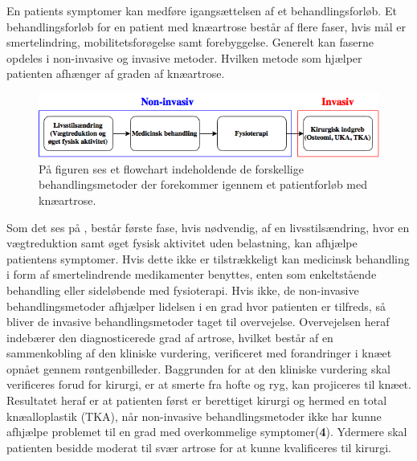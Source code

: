 En patients symptomer kan medføre igangsættelsen af et behandlingsforløb. Et behandlingsforløb for en patient med knæartrose består af flere faser, hvis mål er smertelindring, mobilitetsforøgelse samt forebyggelse. Generelt kan faserne opdeles i non-invasive og invasive metoder. Hvilken metode som hjælper patienten afhænger af graden af knæartrose.

\begin{figure}[H]
	\centering
	\includegraphics[width=1\textwidth]{figures/bProblemanalyse/flowchart_behandlingsforloeb.png}
	\caption{På figuren ses et flowchart indeholdende de forskellige behandlingsmetoder der forekommer igennem et patientforløb med knæartrose.}
	\label{fig:flow_behandlingsfaser}
\end{figure}\vspace{-.25cm}

Som det ses på , består første fase, hvis nødvendig, af en livsstilsændring, hvor en vægtreduktion samt øget fysisk aktivitet uden belastning, kan afhjælpe patientens symptomer. Hvis dette ikke er tilstrækkeligt kan medicinsk behandling i form af smertelindrende medikamenter benyttes, enten som enkeltstående behandling eller sideløbende med fysioterapi. Hvis ikke, de non-invasive behandlingsmetoder afhjælper lidelsen i en grad hvor patienten er tilfreds, så bliver de invasive behandlingsmetoder taget til overvejelse. Overvejelsen heraf indebærer den diagnosticerede grad af artrose, hvilket består af en sammenkobling af den kliniske vurdering, verificeret med forandringer i knæet opnået gennem røntgenbilleder. Baggrunden for at den kliniske vurdering skal verificeres forud for kirurgi, er at smerte fra hofte og ryg, kan projiceres til knæet. Resultatet heraf er at patienten først er berettiget kirurgi og hermed en total knæalloplastik (TKA), når non-invasive behandlingsmetoder ikke har kunne afhjælpe problemet til en grad med overkommelige symptomer(\textbf{4}). Ydermere skal patienten besidde moderat til svær artrose for at kunne kvalificeres til kirurgi. \citep{Lind2016b} \citep{brostrom2012} \citep{skou2016}





